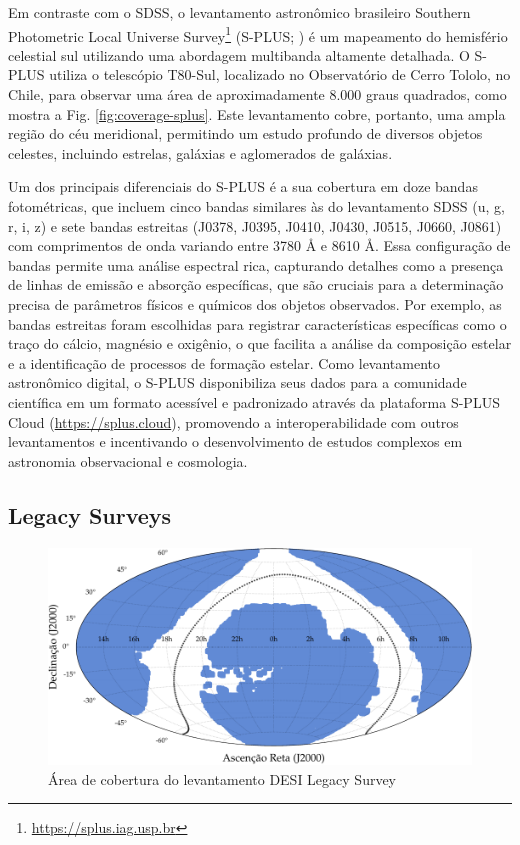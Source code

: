 Em contraste com o SDSS, o levantamento astronômico brasileiro Southern Photometric Local Universe Survey\footnote{\url{https://splus.iag.usp.br}} (S-PLUS; \citealp{splus}) é um mapeamento do hemisfério celestial sul utilizando uma abordagem multibanda altamente detalhada. O S-PLUS utiliza o telescópio T80-Sul, localizado no Observatório de Cerro Tololo, no Chile, para observar uma área de aproximadamente 8.000 graus quadrados, como mostra a Fig. \ref{fig:coverage-splus}. Este levantamento cobre, portanto, uma ampla região do céu meridional, permitindo um estudo profundo de diversos objetos celestes, incluindo estrelas, galáxias e aglomerados de galáxias.

Um dos principais diferenciais do S-PLUS é a sua cobertura em doze bandas fotométricas, que incluem cinco bandas similares às do levantamento SDSS (u, g, r, i, z) e sete bandas estreitas (J0378, J0395, J0410, J0430, J0515, J0660, J0861) com comprimentos de onda variando entre 3780 $\si{\angstrom}$ e 8610 $\si{\angstrom}$. Essa configuração de bandas permite uma análise espectral rica, capturando detalhes como a presença de linhas de emissão e absorção específicas, que são cruciais para a determinação precisa de parâmetros físicos e químicos dos objetos observados. Por exemplo, as bandas estreitas foram escolhidas para registrar características específicas como o traço do cálcio, magnésio e oxigênio, o que facilita a análise da composição estelar e a identificação de processos de formação estelar. Como levantamento astronômico digital, o S-PLUS disponibiliza seus dados para a comunidade científica em um formato acessível e padronizado através da plataforma S-PLUS Cloud (\url{https://splus.cloud}), promovendo a interoperabilidade com outros levantamentos e incentivando o desenvolvimento de estudos complexos em astronomia observacional e cosmologia.




\subsection{Legacy Surveys}
\label{sec:legacy}
\begin{figure}[!ht]
  \caption{Área de cobertura do levantamento DESI Legacy Survey}
  \label{fig:coverage-legacy}
  \includegraphics[width=\linewidth]{notebooks/plots/legacy_footprint.pdf}
\end{figure}


